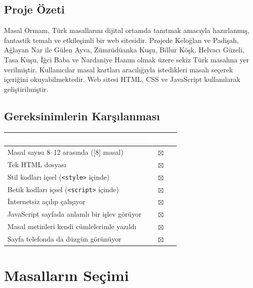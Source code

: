\documentclass[12pt,a4paper]{article}
\begin{document}
\subsection{Proje Özeti}
Masal Ormanı, Türk masallarını dijital ortamda tanıtmak amacıyla hazırlanmış, fantastik temalı ve etkileşimli bir web sitesidir. Projede Keloğlan ve Padişah, Ağlayan Nar ile Gülen Ayva, Zümrüdüanka Kuşu, Billur Köşk, Helvacı Güzeli, Tasa Kuşu, İğci Baba ve Nardaniye Hanım olmak üzere sekiz Türk masalına yer verilmiştir. Kullanıcılar masal kartları aracılığıyla istedikleri masalı seçerek içeriğini okuyabilmektedir. Web sitesi HTML, CSS ve JavaScript kullanılarak geliştirilmiştir.

\subsection{Gereksinimlerin Karşılanması}
\begin{center}
\begin{tabular}{@{}p{8.2cm}c@{}}
\toprule
\rowcolor{ana}\textcolor{white}{\textbf{Gereksinim}} & \textcolor{white}{\textbf{Durum}} \\
\midrule
Masal sayısı 8--12 arasında ([8] masal)          & $\boxtimes$ \\
Tek HTML dosyası                                 & $\boxtimes$ \\
Stil kodları içsel (\texttt{<style>} içinde)     & $\boxtimes$ \\
Betik kodları içsel (\texttt{<script>} içinde)   & $\boxtimes$ \\
İnternetsiz açılıp çalışıyor                     & $\boxtimes$ \\
JavaScript sayfada anlamlı bir işlev görüyor     & $\boxtimes$ \\
Masal metinleri kendi cümlelerimle yazıldı       & $\boxtimes$ \\
Sayfa telefonda da düzgün görünüyor              & $\boxtimes$ \\
\bottomrule
\end{tabular}
\end{center}

\section{Masalların Seçimi}
\end{document}
